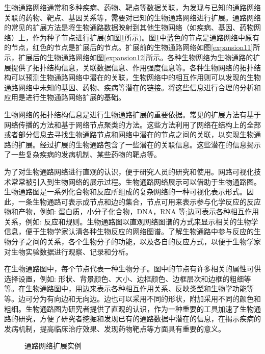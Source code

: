 生物通路网络通常和多种疾病、药物、靶点等数据关联，为发现与已知的通路网络关联的药物、靶点、基因关系等，需要对已知的生物通路网络进行扩展。通路网络的常见的扩展方法是将生物通路数据映射到其他生物网络（如疾病、基因、药物网络）上，作为种子节点进行扩展(如图\ref{fig1}所示)。图\ref{fig1}中蓝色的节点是通路网络中原有的节点，红色的节点是扩展后的节点。扩展前的生物通路网络如图\ref{expansion11}所示，扩展后的生物通路网络如图\ref{expansion12}所示。各种生物网络为生物通路的扩展提供了拓扑结构信息，关联数据信息、作用强度信息等。各种生物网络的拓扑结构可以预测生物通路网络中潜在的关联，生物网络中的相互作用则可以发现的生物通路网络中未知的基因、药物、疾病等潜在的链接。将这些信息进行合理的分析和应用是进行生物通路网络扩展的基础。

 生物网络的拓扑结构信息是进行生物通路扩展的重要依据。常见的扩展方法有基于网络传播的方法和基于网络节点聚类的方法。这些方法利用了网络在结构上的全部或者部分信息去寻找生物通路节点和网络中潜在的节点之间的关联，以实现生物通路的扩展。经过扩展的生物通路包含了一些潜在的关联信息。这些潜在的信息揭示了一些复杂疾病的发病机制、某些药物的靶点等。

为了对生物通路网络进行直观的认识，便于研究人员的研究和使用。网路可视化技术常常被引入到生物网络的展示过程。生物通路网络展示可以借助于生物通路图。生物通路图是一系列化合物和反应所组成的复杂网络的一种可视化表示形式。因此，一条生物通路可表示成节点和边的集合，节点可用来表示参与化学反应的反应物和产物，例如: 蛋白质，小分子化合物，DNA，RNA 等;边可表示各种相互作用关系，例如: 反应和规则。生物通路图以直观网络图谱的方式来显示相关的生物学信息，便于生物学家认清各种生物反应的网络图谱。了解生物通路中参与反应的生物分子之间的关系，各个生物分子的功能，以及各自的反应方式，以便于生物学家对生物实验数据进行观察、记录和分析。

在生物通路图中，每个节点代表一种生物分子。图中的节点有许多相关的属性可供选择设置，例如: 形状、背景颜色、大小、边框颜色、边框层次和边框的粗细等等。在生物通路图中，用边来表示各种相互作用关系、反映类型和生物学功能等等。边可分为有向边和无向边。边也可以采用不同的形状，附加采用不同的颜色和粗细。生物通路图为研究者提供了直观的认识，作为一种重要的工具加速了生物通路的研究，方便了研究者挖掘和发现已有的通路数据中潜在的信息，在揭示疾病的发病机制，提高临床治疗效果、发现药物靶点等方面具有重要的意义。

\begin{figure}{\label{fig1}}
  \centering
  \begin{minipage}{.95\linewidth}
    \setlength{\subfigcapskip}{-1bp}
    \centering
    \begin{minipage}{\textwidth}
      \centering
      \subfigure{\label{expansion11}}\addtocounter{subfigure}{-2}
      \subfigure{\subfigure[扩展前的生物通路网络]{\texttt{[image: 1-a]}}}
      \subfigure{\label{expansion12}}\addtocounter{subfigure}{-2}
      \subfigure{\subfigure[扩展后的生物通路网络]{\texttt{[image: 1-b]}}}
    \end{minipage}
	\caption[fig1]{通路网络扩展实例}
  \end{minipage}
\end{figure}

